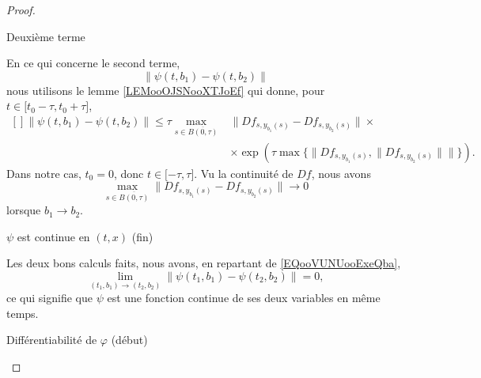 \begin{proof}
\begin{subproof}
\begin{subproof}
        \item[Deuxième terme]

            En ce qui concerne le second terme,
            \begin{equation}
                \| \psi(t,b_1)-\psi(t,b_2) \|
            \end{equation}
            nous utilisons le lemme \ref{LEMooOJSNooXTJoEf} qui donne, pour \( t\in\mathopen[ t_0 -\tau, t_0+\tau \mathclose]\),
            \begin{equation}
                \begin{aligned}[]
                    \| \psi(t,b_1)-\psi(t,b_2) \|\leq\tau\max_{s\in \overline{ B(0,\tau) }}&\| Df_{s,y_{b_1}(s)}-Df_{s,y_{b_2}(s)} \|\times\\
                    &\times \exp\left( \tau\max\{ \| Df_{s,y_{b_1}(s)},\| Df_{s,y_{b_2}(s)} \| \| \} \right).
                \end{aligned}
            \end{equation}
            Dans notre cas, \( t_0=0\), donc \( t\in\mathopen[ -\tau , \tau \mathclose]\). Vu la continuité de \( Df\), nous avons
            \begin{equation}
                    \max_{s\in \overline{ B(0,\tau) }}\| Df_{s,y_{b_1}(s)}-Df_{s,y_{b_2}(s)} \|\to 0
            \end{equation}
            lorsque \( b_1\to b_2\).

        \item[\( \psi\) est continue en \( (t,x)\) (fin)]

            Les deux bons calculs faits, nous avons, en repartant de \eqref{EQooVUNUooExeQba},
            \begin{equation}
                \lim_{(t_1,b_1)\to(t_2,b_2)}\| \psi(t_1,b_1)-\psi(t_2,b_2) \|=0,
            \end{equation}
            ce qui signifie que \( \psi\) est une fonction continue de ses deux variables en même temps.
            \end{subproof}

        \item[Différentiabilité de \( \varphi\) (début)]


\end{subproof}
\end{proof}
